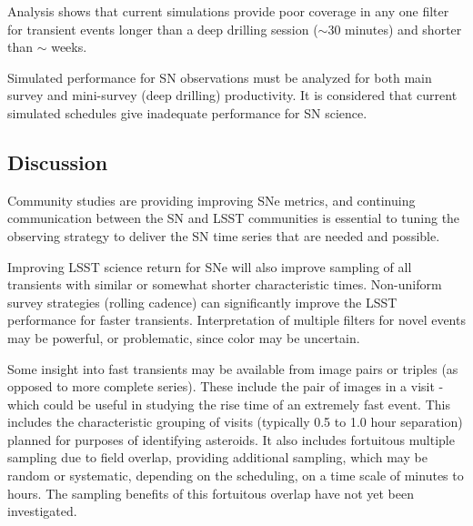 Analysis shows that current simulations provide  poor coverage in any one filter for transient events longer than a deep drilling session ($\sim$30 minutes) and shorter than $\sim$ weeks.

Simulated performance for SN observations must be analyzed for both
main survey and mini-survey (deep drilling) productivity.  It is
considered that current simulated schedules give inadequate
performance for SN science.




\subsection{Discussion}
\label{sec:\chpname:discussion}

Community studies are providing improving SNe metrics, and continuing
communication between the SN and LSST communities is essential to
tuning the observing strategy to deliver the SN time series that are
needed and possible.

Improving LSST science return for SNe will also improve sampling of
all transients with similar or somewhat shorter characteristic times.
Non-uniform survey strategies (rolling cadence) can significantly
improve the LSST performance for faster transients.  Interpretation of
multiple filters for novel events may be powerful, or problematic,
since color may be uncertain.

Some insight into fast transients may be available from image pairs or
triples (as opposed to more complete series).  These include the pair
of images in a visit - which could be useful in studying the rise time
of an extremely fast event.  This includes the characteristic grouping
of visits (typically 0.5 to 1.0 hour separation) planned for purposes
of identifying asteroids.  It also includes fortuitous multiple
sampling due to field overlap, providing additional sampling, which
may be random or systematic, depending on the scheduling, on a time
scale of minutes to hours.  The sampling benefits of this fortuitous
overlap have not yet been investigated.


\navigationbar












